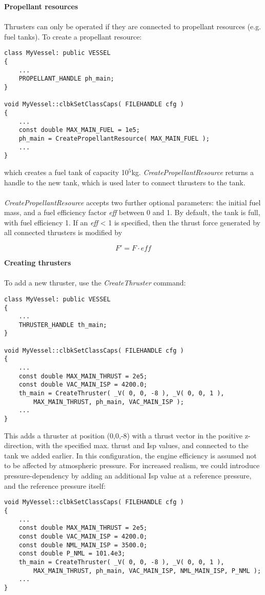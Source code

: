 \documentclass[Orbiter Developer Manual.tex]{subfiles}
\begin{document}
\noindent
\textbf{Propellant resources}\\
\\
Thrusters can only be operated if they are connected to propellant resources (e.g. fuel tanks). To create a propellant resource:

\begin{lstlisting}
class MyVessel: public VESSEL
{
	...
	PROPELLANT_HANDLE ph_main;
}

void MyVessel::clbkSetClassCaps( FILEHANDLE cfg )
{
	...
	const double MAX_MAIN_FUEL = 1e5;
	ph_main = CreatePropellantResource( MAX_MAIN_FUEL );
	...
}
\end{lstlisting}

\noindent
which creates a fuel tank of capacity 10$^{5}$kg. \textit{CreatePropellantResource} returns a handle to the new tank, which is used later to connect thrusters to the tank.\\
\\
\textit{CreatePropellantResource} accepts two further optional parameters: the initial fuel mass, and a fuel efficiency factor \textit{eff} between 0 and 1. By default, the tank is full, with fuel efficiency 1. If an \textit{eff} < 1 is specified, then the thrust force generated by all connected thrusters is modified by

\[ F' = F \cdot eff \]

\noindent
\textbf{Creating thrusters}\\
\\
To add a new thruster, use the \textit{CreateThruster} command:
\begin{lstlisting}
class MyVessel: public VESSEL
{
	...
	THRUSTER_HANDLE th_main;
}

void MyVessel::clbkSetClassCaps( FILEHANDLE cfg )
{
	...
	const double MAX_MAIN_THRUST = 2e5;
	const double VAC_MAIN_ISP = 4200.0;
	th_main = CreateThruster( _V( 0, 0, -8 ), _V( 0, 0, 1 ),
		MAX_MAIN_THRUST, ph_main, VAC_MAIN_ISP );
	...
}
\end{lstlisting}

\noindent
This adds a thruster at position (0,0,-8) with a thrust vector in the positive z-direction, with the specified max. thrust and Isp values, and connected to the tank we added earlier. In this configuration, the engine efficiency is assumed not to be affected by atmospheric pressure. For increased realism, we could introduce pressure-dependency by adding an additional Isp value at a reference pressure, and the reference pressure itself:


\begin{lstlisting}
void MyVessel::clbkSetClassCaps( FILEHANDLE cfg )
{
	...
	const double MAX_MAIN_THRUST = 2e5;
	const double VAC_MAIN_ISP = 4200.0;
	const double NML_MAIN_ISP = 3500.0;
	const double P_NML = 101.4e3;
	th_main = CreateThruster( _V( 0, 0, -8 ), _V( 0, 0, 1 ),
		MAX_MAIN_THRUST, ph_main, VAC_MAIN_ISP, NML_MAIN_ISP, P_NML );
	...
}
\end{lstlisting}
\end{document}
